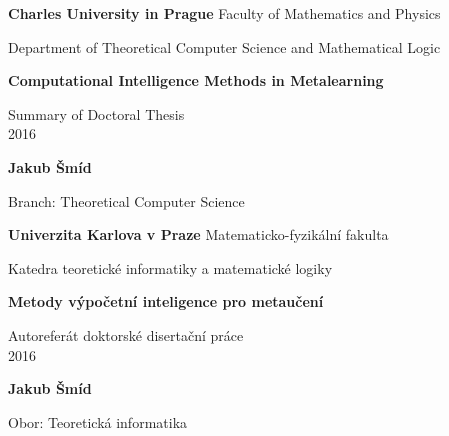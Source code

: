 \documentclass{article}
\begin{document}
\pagestyle{empty}
\begin{center}	
	
	\textbf{\huge{Charles University in Prague}}
	\LARGE{Faculty of Mathematics and Physics}
	
	\vspace{30pt}
	
	\LARGE{Department of Theoretical Computer Science and Mathematical Logic}
	
	\vspace{120pt}
	
	\textbf{\huge{Computational Intelligence Methods in Metalearning}}
	
	\vspace{60pt}
	
	\LARGE{Summary of Doctoral Thesis} \\
	
	
	\LARGE{2016}
	
	\vspace{30pt}
	
	\textbf{\LARGE{Jakub Šmíd}}
	
	\vspace{80pt}
	
	\large{Branch: Theoretical Computer Science}
\end{center}
\newpage

\pagestyle{empty}
\begin{center}	
	
	\textbf{\huge{Univerzita Karlova v Praze}}
	\LARGE{Matematicko-fyzikální fakulta}
	
	\vspace{30pt}
	
	\LARGE{Katedra teoretické informatiky a matematické logiky}
	
	\vspace{120pt}
	
	\textbf{\huge{Metody výpočetní inteligence pro metaučení}}
	
	\vspace{60pt}
	
	\LARGE{Autoreferát doktorské disertační práce} \\
	
	
	\LARGE{2016}
	
	\vspace{30pt}
	
	\textbf{\LARGE{Jakub Šmíd}}
	
	\vspace{80pt}
	
	\large{Obor: Teoretická informatika}
\end{center}
\end{document}
